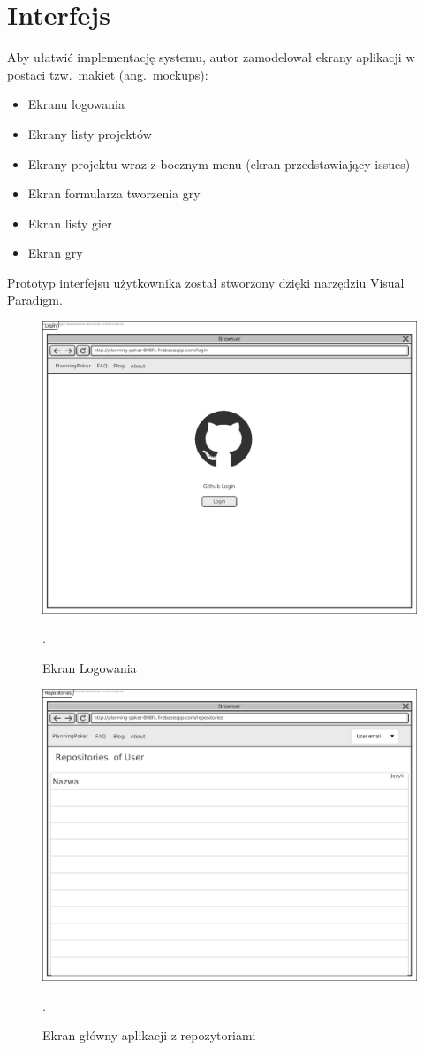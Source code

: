 \section{Interfejs}
Aby ułatwić implementację systemu, autor zamodelował ekrany aplikacji w postaci
tzw.\ makiet (ang.\ mockups):
\begin{itemize}
    \item Ekranu logowania
    \item Ekrany listy projektów
    \item Ekrany projektu wraz z bocznym menu (ekran przedstawiający issues)
    \item Ekran formularza tworzenia gry
    \item Ekran listy gier
    \item Ekran gry
\end{itemize}
Prototyp interfejsu użytkownika został stworzony dzięki narzędziu Visual Paradigm.
\begin{figure}[H]
	\centering\includegraphics[width=.7\textwidth]{img/LoginScreen.png}
	\caption{Ekran Logowania}.\label{rys:loginScreen}
\end{figure}
\begin{figure}[H]
	\centering\includegraphics[width=.7\textwidth]{img/RepositoriesScreen.png}
	\caption{Ekran główny aplikacji z repozytoriami}.\label{rys:RepositoriesScreen}
\end{figure}
